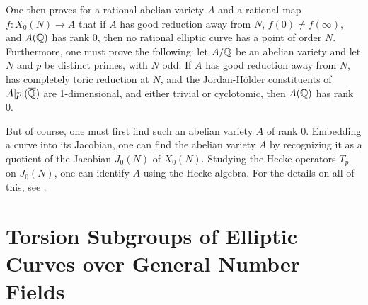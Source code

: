 One then proves for a rational abelian variety $A$ and a rational map $f: X_0(N) \to A$ that if $A$ has good reduction away from $N$, $f(0) \neq f(\infty)$, and $A(\mathbb{Q})$ has rank 0, then no rational elliptic curve has a point of order $N$. Furthermore, one must prove the following: let $A/\mathbb{Q}$ be an abelian variety and let $N$ and $p$ be distinct primes, with $N$ odd. If $A$ has good reduction away from $N$, has completely toric reduction at $N$, and the Jordan-H\"older constituents of $A[p](\overline{\mathbb{Q}})$ are 1-dimensional, and either trivial or cyclotomic, then $A(\mathbb{Q})$ has rank 0. 


But of course, one must first find such an abelian variety $A$ of rank 0. Embedding a curve into its Jacobian, one can find the abelian variety $A$ by recognizing it as a quotient of the Jacobian $J_0(N)$ of $X_0(N)$. Studying the Hecke operators $T_p$ on $J_0(N)$, one can identify $A$ using the Hecke algebra. For the details on all of this, see \cite{snowden}. 





\section{Torsion Subgroups of Elliptic Curves over General Number Fields}


